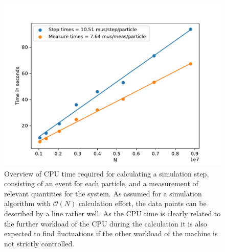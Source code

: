 \begin{figure}[h!]
\centering
\includegraphics[width=0.7 \linewidth]{../plots/Calculation_times_measurement.pdf}
\caption{Overview of CPU time required for calculating a simulation step, consisting of an event for each particle, and a measurement of relevant quantities for the system. As assumed for a simulation algorithm with $\mathcal{O}(N)$ calculation effort, the data points can be described by a line rather well. As the CPU time is clearly related to the further workload of the CPU during the calculation it is also expected to find fluctuations if the other workload of the machine is not strictly controlled.}
\label{fig:calc_time}
\end{figure}



